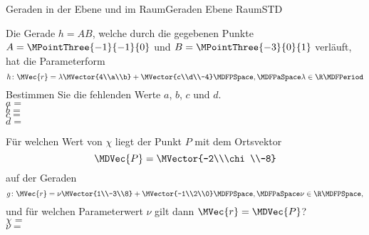 \begin{MXContent}{Geraden in der Ebene und im Raum}{Geraden Ebene Raum}{STD}
\begin{MExercise}
\begin{MExerciseItems}
\item{
Die Gerade $h=A B$, welche durch die gegebenen Punkte $A=\MPointThree{-1}{-1}{0}$ und $B=\MPointThree{-3}{0}{1}$ verläuft,
hat die Parameterform
\[
 h\colon \MVec{r}=\lambda\MVector{4\\a\\b}+\MVector{c\\d\\-4}\MDFPSpace,\MDFPaSpace\lambda\in\R \MDFPeriod
\]
Bestimmen Sie die fehlenden Werte $a$, $b$, $c$ und $d$.\\
$a=$\\
$b=$\\
$c=$\\
$d=$\\
}
\item{
Für welchen Wert von $\chi$ liegt der Punkt $P$ mit dem Ortsvektor
\[
 \MDVec{P}=\MVector{-2\\\chi\\-8}
\]
auf der Geraden 
\[
 g\colon \MVec{r}=\nu\MVector{1\\-3\\8}+\MVector{-1\\2\\0}\MDFPSpace,\MDFPaSpace\nu\in\R \MDFPSpace ,
\]
und für welchen Parameterwert $\nu$ gilt dann $\MVec{r}=\MDVec{P}$?\\
$\chi=$\\
$\nu=$
}
\end{MExerciseItems}


\end{MExercise}
\end{MXContent}
